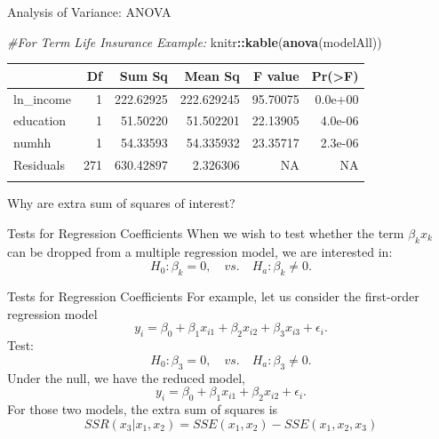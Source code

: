\documentclass[
  ignorenonframetext,
]{beamer}
\newenvironment{Shaded}{\begin{snugshade}}{\end{snugshade}}
\newcommand{\CommentTok}[1]{\textcolor[rgb]{0.56,0.35,0.01}{\textit{#1}}}
\newcommand{\FunctionTok}[1]{\textcolor[rgb]{0.13,0.29,0.53}{\textbf{#1}}}
\newcommand{\NormalTok}[1]{#1}
\newcommand{\SpecialCharTok}[1]{\textcolor[rgb]{0.81,0.36,0.00}{\textbf{#1}}}
\begin{document}
\begin{frame}[fragile]{Analysis of Variance: ANOVA}
\label{analysis-of-variance-anova-1}
\normalsize

\begin{Shaded}
\begin{Highlighting}[]
\CommentTok{\#For Term Life Insurance Example:}
\NormalTok{knitr}\SpecialCharTok{::}\FunctionTok{kable}\NormalTok{(}\FunctionTok{anova}\NormalTok{(modelAll))}
\end{Highlighting}
\end{Shaded}

\begin{longtable}[]{@{}lrrrrr@{}}
\toprule\noalign{}
& Df & Sum Sq & Mean Sq & F value & Pr(\textgreater F) \\
\midrule\noalign{}
\endhead
ln\_income & 1 & 222.62925 & 222.629245 & 95.70075 & 0.0e+00 \\
education & 1 & 51.50220 & 51.502201 & 22.13905 & 4.0e-06 \\
numhh & 1 & 54.33593 & 54.335932 & 23.35717 & 2.3e-06 \\
Residuals & 271 & 630.42897 & 2.326306 & NA & NA \\
\bottomrule\noalign{}
\end{longtable}

\normalsize

Why are extra sum of squares of interest?
\end{frame}

\begin{frame}{Tests for Regression Coefficients}
\label{tests-for-regression-coefficients}
When we wish to test whether the term \(\beta_kx_k\) can be dropped from
a multiple regression model, we are interested in:
\[H_0:\beta_k=0, \quad vs. \quad H_a: \beta_k \neq 0.\]
\end{frame}

\begin{frame}{Tests for Regression Coefficients}
\label{tests-for-regression-coefficients-1}
For example, let us consider the first-order regression model
\[y_i=\beta_0+\beta_1 x_{i1}+\beta_2 x_{i2}+\beta_3 x_{i3}+\epsilon_i.\]
Test: \[H_0:\beta_3=0, \quad vs. \quad H_a: \beta_3\neq 0.\] Under the
null, we have the reduced model,
\[y_i=\beta_0+\beta_1 x_{i1}+\beta_2 x_{i2}+\epsilon_i.\] For those two
models, the extra sum of squares is
\[SSR(x_3|x_1,x_2)=SSE(x_1,x_2)-SSE(x_1,x_2,x_3)\]
\end{frame}
\end{document}
